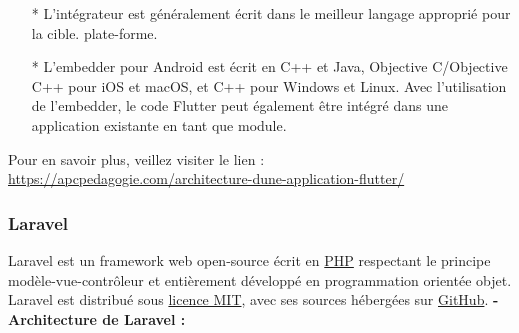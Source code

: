\begin{enumerate}
\begin{enumerate}
			\item[*] L’intégrateur est généralement écrit dans le meilleur langage approprié pour la cible. plate-forme.
			\item[*] L’embedder pour Android est écrit en C++ et Java, Objective C/Objective C++ pour iOS et macOS, et C++ pour Windows et Linux. Avec l’utilisation de l’embedder, le code Flutter peut également être intégré dans une application existante en tant que module.
		\end{enumerate}	
	\end{enumerate}
 Pour en savoir plus, veillez
visiter le lien : \href{https://apcpedagogie.com/architecture-dune-application-flutter/}{https://apcpedagogie.com/architecture-dune-application-flutter/}
\newpage
\subsubsection{Laravel}

Laravel est un framework web open-source écrit en  \href{https://fr.wikipedia.org/wiki/PHP}{PHP} respectant le principe modèle-vue-contrôleur et entièrement développé en programmation orientée objet. Laravel est distribué sous \href{https://fr.wikipedia.org/wiki/Licence_MIT}{licence MIT}, avec ses sources hébergées sur 
\href{https://fr.wikipedia.org/wiki/GitHub}{GitHub}.\newline\newline
\textbf {- Architecture de Laravel :}

